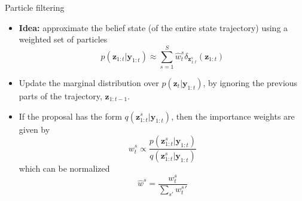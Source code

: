 \documentclass[10pt,mathserif]{beamer}
\begin{document}
\begin{frame}{Particle filtering}
\begin{itemize}
    \item \textbf{Idea:} approximate the belief state (of the entire state trajectory) using a weighted set of particles
    \begin{equation*} 
        p(\bm{z}_{1:t}|\bm{y}_{1:t}) \approx \sum_{s=1}^S{\hat{w}}^s_t\delta_{\bm{z}_{1:t}^s}(\bm{z}_{1:t})
    \end{equation*} 
    \item Update the marginal distribution over $p(\bm{z}_t|\bm{y}_{1:t})$, by ignoring the previous parts of the trajectory, $\bm{z}_{1:t-1}$.
    \item If the proposal has the form $q(\bm{z}_{1:t}^s|\bm{y}_{1:t})$, then the importance weights are given by
    \begin{equation*} 
        w_t^s\propto\frac{p(\bm{z}_{1:t}^s|\bm{y}_{1:t})}{q(\bm{z}_{1:t}^s|\bm{y}_{1:t})}
    \end{equation*} 
    which can be normalized
    \begin{equation*} 
        {\hat{w}}^s = \frac{w_t^s}{\sum_{s'}{w_t^s}'}
    \end{equation*} 
\end{itemize}    
\end{frame}
\end{document}
